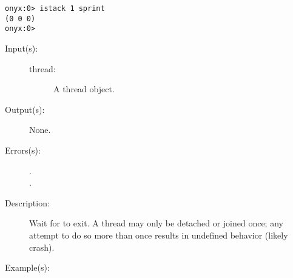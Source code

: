 \begin{description}
\begin{description}
\begin{verbatim}
onyx:0> istack 1 sprint
(0 0 0)
onyx:0>
		\end{verbatim}
	\end{description}
\label{systemdict:join}
\item[{\onyxop{thread}{join}{--}}: ]
	\begin{description}\item[]
	\item[Input(s): ]
		\begin{description}\item[]
		\item[thread: ]
			A thread object.
		\end{description}
	\item[Output(s): ] None.
	\item[Errors(s): ]
		\begin{description}\item[]
		\item[.]
		\item[.]
		\end{description}
	\item[Description: ]
		Wait for  to exit.  A thread may only be detached
		or joined once; any attempt to do so more than once results in
		undefined behavior (likely crash).
	\item[Example(s): ]\begin{verbatim}


\end{verbatim}
\end{description}
\end{description}
